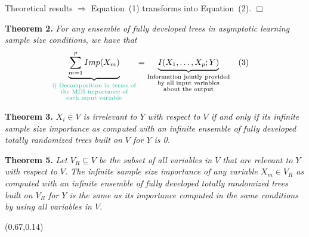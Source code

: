 \documentclass[final]{beamer}
\newcommand{\qedwhite}{\hfill \ensuremath{\Box}}
\begin{document}
\begin{frame}{}
\begin{textblock}{0.32}
\begin{block}{Theoretical results \phantom{p}}
$\Rightarrow$ Equation~(1) transforms into Equation~(2). \qedwhite

\vspace{0.3cm}

\begin{shaded}
\textbf{Theorem 2.}
\textit{For any ensemble of fully developed trees in asymptotic learning sample size
conditions, we have that}
\begin{align*}
\underbrace{\sum_{m=1}^{p}Imp(X_m)}_{{\color{lightgreen} \substack{\text{i) Decomposition in terms of}\\
                                                                   \text{the MDI importance of}\\
                                                                   \text{each input variable}}}} &=
\underbrace{I(X_{1}, \ldots, X_{p} ; Y)}_{\substack{\text{Information jointly provided}\\
                                                    \text{by all input variables}\\
                                                    \text{about the output}}}&&\text{(3)}
\end{align*}

\vspace{0.3cm}

\textbf{Theorem 3.}
\textit{$X_i \in V$ is irrelevant to $Y$ with respect to $V$ if and only if  its
infinite sample size importance as computed with an infinite ensemble of fully
developed totally randomized trees built on $V$ for $Y$ is 0.}

\vspace{0.3cm}

\textbf{Theorem 5.}
\textit{Let $V_R \subseteq V$ be the subset of all variables in $V$ that are relevant to $Y$ with
respect to $V$. The infinite sample size importance of any variable $X_m \in
V_R$ as computed with an infinite ensemble of fully developed totally randomized
trees built on $V_R$ for $Y$ is the same as its importance computed in the same conditions by using all variables in $V$.}
\end{shaded}

\end{block}

\end{textblock}



\begin{textblock}{0.32}(0.67,0.14)


\end{textblock}
\end{frame}
\end{document}
